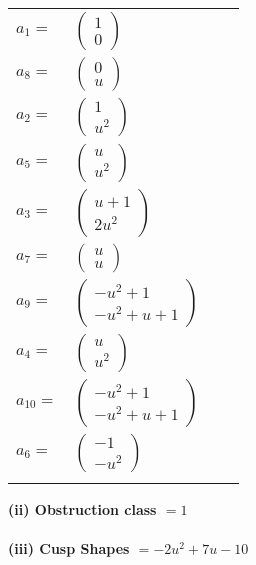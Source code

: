 \documentclass[1p]{elsarticle_modified}
\theoremstyle{definition}
\begin{document}
\begin{tabular}{m{7pt} m{180pt} m{7pt} m{180pt} }
\flushright $a_{1}=$&$\begin{pmatrix}1\\0\end{pmatrix}$ \\
\flushright $a_{8}=$&$\begin{pmatrix}0\\u\end{pmatrix}$ \\
\flushright $a_{2}=$&$\begin{pmatrix}1\\u^2\end{pmatrix}$ \\
\flushright $a_{5}=$&$\begin{pmatrix}u\\u^2\end{pmatrix}$ \\
\flushright $a_{3}=$&$\begin{pmatrix}u+1\\2 u^2\end{pmatrix}$ \\
\flushright $a_{7}=$&$\begin{pmatrix}u\\u\end{pmatrix}$ \\
\flushright $a_{9}=$&$\begin{pmatrix}- u^2+1\\- u^2+u+1\end{pmatrix}$ \\
\flushright $a_{4}=$&$\begin{pmatrix}u\\u^2\end{pmatrix}$ \\
\flushright $a_{10}=$&$\begin{pmatrix}- u^2+1\\- u^2+u+1\end{pmatrix}$ \\
\flushright $a_{6}=$&$\begin{pmatrix}-1\\- u^2\end{pmatrix}$\\&\end{tabular}
\flushleft \textbf{(ii) Obstruction class $= 1$}\\~\\
\flushleft \textbf{(iii) Cusp Shapes $= -2 u^2+7 u-10$}\\~\\
\end{document}
